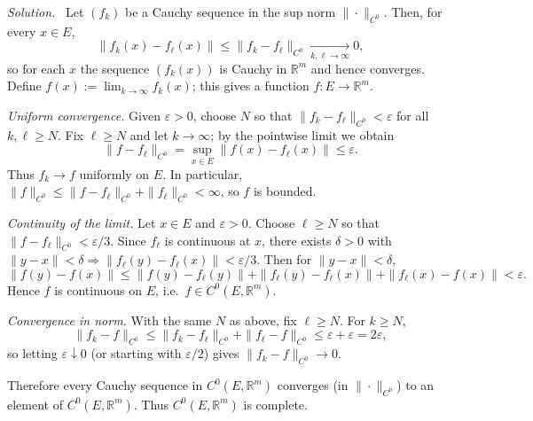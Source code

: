 \documentclass[11pt,a4paper]{article}
\newenvironment{solution}{\par\noindent\textit{Solution.}\ }{\par\vspace{0.5em}}
\begin{document}
\begin{solution}
	Let $(f_k)$ be a Cauchy sequence in the sup norm $\|\cdot\|_{C^0}$.
	Then, for every $x\in E$,
	\[
	\|f_k(x)-f_\ell(x)\|\le \|f_k-f_\ell\|_{C^0}\xrightarrow[k,\ell\to\infty]{} 0,
	\]
	so for each $x$ the sequence $(f_k(x))$ is Cauchy in $\mathbb{R}^m$ and hence converges. Define
	$f(x):=\lim_{k\to\infty}f_k(x)$; this gives a function $f:E\to\mathbb{R}^m$.
	
	\emph{Uniform convergence.} Given $\varepsilon>0$, choose $N$ so that $\|f_k-f_\ell\|_{C^0}<\varepsilon$ for
	all $k,\ell\ge N$. Fix $\ell\ge N$ and let $k\to\infty$; by the pointwise limit we obtain
	\[
	\|f-f_\ell\|_{C^0}=\sup_{x\in E}\|f(x)-f_\ell(x)\|\le \varepsilon.
	\]
	Thus $f_k\to f$ uniformly on $E$. In particular, $\|f\|_{C^0}\le \|f-f_\ell\|_{C^0}+\|f_\ell\|_{C^0}<\infty$, so $f$ is bounded.
	
	\emph{Continuity of the limit.} Let $x\in E$ and $\varepsilon>0$. Choose $\ell\ge N$ so that
	$\|f-f_\ell\|_{C^0}<\varepsilon/3$. Since $f_\ell$ is continuous at $x$, there exists $\delta>0$ with
	$\|y-x\|<\delta\Rightarrow \|f_\ell(y)-f_\ell(x)\|<\varepsilon/3$. Then for $\|y-x\|<\delta$,
	\[
	\|f(y)-f(x)\|\le \|f(y)-f_\ell(y)\|+\|f_\ell(y)-f_\ell(x)\|+\|f_\ell(x)-f(x)\|<\varepsilon.
	\]
	Hence $f$ is continuous on $E$, i.e.\ $f\in C^0(E,\mathbb{R}^m)$.
	
	\emph{Convergence in norm.} With the same $N$ as above, fix $\ell\ge N$. For $k\ge N$,
	\[
	\|f_k-f\|_{C^0}\le \|f_k-f_\ell\|_{C^0}+\|f_\ell-f\|_{C^0}\le \varepsilon+\varepsilon=2\varepsilon,
	\]
	so letting $\varepsilon\downarrow 0$ (or starting with $\varepsilon/2$) gives $\|f_k-f\|_{C^0}\to 0$.
	
	Therefore every Cauchy sequence in $C^0(E,\mathbb{R}^m)$ converges (in $\|\cdot\|_{C^0}$) to an element of
	$C^0(E,\mathbb{R}^m)$. Thus $C^0(E,\mathbb{R}^m)$ is complete.
\end{solution}
\end{document}
